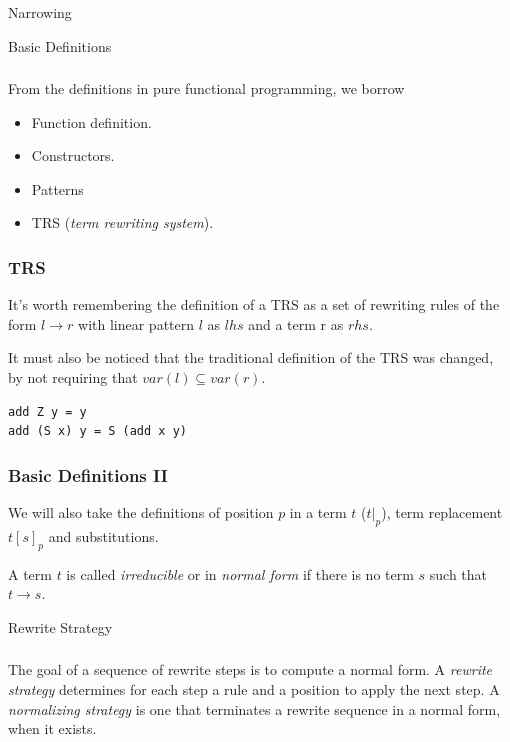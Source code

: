 \documentclass{beamer}
\begin{document}
\begin{section}{Narrowing}
  \begin{subsection}{Basic Definitions}
\begin{frame}
\frametitle{\subsecname}
  From the definitions in pure functional programming, we borrow
  \begin{itemize}
    \item Function definition.
    \item Constructors.
    \item Patterns
    \item TRS (\textit{term rewriting system}).
  \end{itemize}


\end{frame}

\begin{frame}
[fragile]
\frametitle{TRS}
 It's worth remembering the definition of a TRS as a set of rewriting rules of the form $l \rightarrow r$ with linear pattern $l$ as $lhs$ and a term r as $rhs$.

  It must also be noticed that the traditional definition of the TRS was changed, by not requiring that $var(l) \subseteq var(r)$.

\begin{example}
\begin{verbatim}
add Z y = y
add (S x) y = S (add x y)
\end{verbatim}
\end{example}

\end{frame}

\begin{frame}
[fragile]

\frametitle{Basic Definitions II}
  We will also take the definitions of position $p$ in a term $t$ ($t|_p$), term replacement $t[s]_p$ and substitutions.

\bigskip
  A term $t$ is called \textit{irreducible} or in \textit{normal form} if there is no term $s$ such that $t \rightarrow s$.
\end{frame}
\end{subsection}

\begin{subsection}{Rewrite Strategy}

  \begin{frame}
\frametitle{\subsecname}
  The goal of a sequence of rewrite steps is to compute a normal form. A \textit{rewrite strategy} determines for each step a rule and a position to apply the next step. A \textit{normalizing strategy} is one that terminates a rewrite sequence in a normal form, when it exists.
\end{frame}


\end{subsection}
\end{section}
\end{document}
